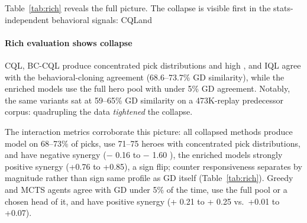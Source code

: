 \documentclass[journal]{IEEEtran}
\providecommand{\DIFaddtex}[1]{{\protect\color{blue} \sf #1}} %
\providecommand{\DIFdeltex}[1]{{\protect\color{red} \scriptsize #1}} %
\providecommand{\DIFaddbegin}{} %
\providecommand{\DIFaddend}{} %
\providecommand{\DIFdelbegin}{} %
\providecommand{\DIFdelend}{} %
\providecommand{\DIFadd}[1]{\texorpdfstring{\DIFaddtex{#1}}{#1}} %
\providecommand{\DIFdel}[1]{\texorpdfstring{\DIFdeltex{#1}}{}} %
\begin{document}

\DIFdel{Table~\ref{tab:rich} reveals the full picture. The collapse is visible first in the stats-independent behavioral signals: CQLand }\DIFdelend \DIFaddbegin \paragraph{\DIFadd{Rich evaluation shows collapse}} \DIFadd{CQL, }\DIFaddend BC-CQL\DIFdelbegin \DIFdel{produce concentrated pick distributions and high }\DIFdelend \DIFaddbegin \DIFadd{, and IQL agree with the }\DIFaddend behavioral-cloning \DIFdelbegin \DIFdel{agreement (68.6--73.7\% GD similarity), while the enriched models use the full hero pool with under 5\% GD agreement. Notably, the same variants sat at 59--65\% GD similarity on a 473K-replay predecessor corpus: quadrupling the data \textit{tightened} the collapse.
}%

\DIFdel{The interaction metrics corroborate this picture: all collapsed methods produce }\DIFdelend \DIFaddbegin \DIFadd{model on 68--73\% of picks, use 71--75 heroes with concentrated pick distributions, and have }\DIFaddend negative synergy ($-$\DIFdelbegin \DIFdel{0.16 }\DIFdelend \DIFaddbegin \DIFadd{0.13 }\DIFaddend to $-$\DIFdelbegin \DIFdel{1.60}\DIFdelend \DIFaddbegin \DIFadd{0.18}\DIFaddend ), the \DIFdelbegin \DIFdel{enriched models strongly positive synergy (+0.76 to +0.85), a sign flip; counter responsiveness separates by magnitude rather than sign }\DIFdelend \DIFaddbegin \DIFadd{same profile as GD itself (Table~\ref{tab:rich}). Greedy and MCTS agents agree with GD under 5\% of the time, use the full pool or a chosen head of it, and have positive synergy }\DIFaddend (+\DIFdelbegin \DIFdel{0.21 }\DIFdelend \DIFaddbegin \DIFadd{0.36 }\DIFaddend to +\DIFdelbegin \DIFdel{0.25 vs.\ +0.01 to +0.07). }%
\end{document}
